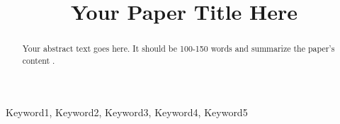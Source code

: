 \documentclass[conference]{IEEEtran}
\title{Your Paper Title Here}
\author{
    \IEEEauthorblockN{Author Name}
    \IEEEauthorblockA{Affiliation\\
    Email: email@example.com}
    \and
    \IEEEauthorblockN{Second Author Name}
    \IEEEauthorblockA{Affiliation\\
    Email: email2@example.com}
}
\begin{document}
\maketitle
\begin{abstract}
    Your abstract text goes here. It should be 100-150 words and summarize the paper's content \cite{smith2020}.
\end{abstract}

\begin{IEEEkeywords}
    Keyword1, Keyword2, Keyword3, Keyword4, Keyword5
\end{IEEEkeywords}









\end{document}
